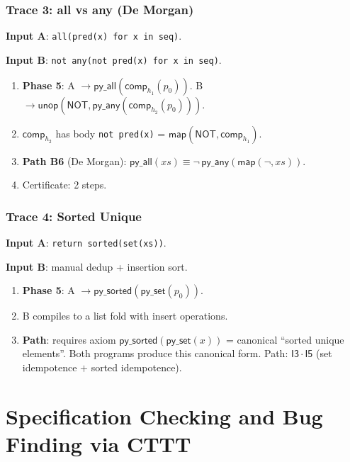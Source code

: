 \section{Trace 3: all vs any (De Morgan)}

\textbf{Input A}: \texttt{all(pred(x) for x in seq)}.

\textbf{Input B}: \texttt{not any(not pred(x) for x in seq)}.

\begin{enumerate}
  \item \textbf{Phase 5}: A $\to \mathsf{py\_all}(\mathsf{comp}_{h_1}(p_0))$.
    B $\to \mathsf{unop}(\mathsf{NOT}, \mathsf{py\_any}(\mathsf{comp}_{h_2}(p_0)))$.
  \item $\mathsf{comp}_{h_2}$ has body \texttt{not pred(x)} =
    $\mathsf{map}(\mathsf{NOT}, \mathsf{comp}_{h_1})$.
  \item \textbf{Path B6} (De Morgan): $\mathsf{py\_all}(xs) \equiv
    \lnot\,\mathsf{py\_any}(\mathsf{map}(\lnot, xs))$.
  \item Certificate: 2 steps.
\end{enumerate}

\section{Trace 4: Sorted Unique}

\textbf{Input A}: \texttt{return sorted(set(xs))}.

\textbf{Input B}: manual dedup + insertion sort.

\begin{enumerate}
  \item \textbf{Phase 5}: A $\to \mathsf{py\_sorted}(\mathsf{py\_set}(p_0))$.
  \item B compiles to a list fold with insert operations.
  \item \textbf{Path}: requires axiom $\mathsf{py\_sorted}(\mathsf{py\_set}(x))$
    = canonical ``sorted unique elements''.  Both programs produce this
    canonical form.  Path: $\mathsf{I3} \cdot \mathsf{I5}$
    (set idempotence $+$ sorted idempotence).
\end{enumerate}


\part{Specification Checking and Bug Finding via CTTT}

